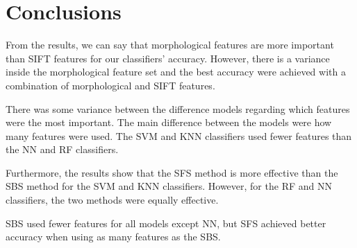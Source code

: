 \documentclass{kththesis}
\begin{document}
\chapter{Conclusions}

From the results, we can say that morphological features are more important than SIFT features for our classifiers' accuracy. However, there is a variance inside the morphological feature set and the best accuracy were achieved with a combination of morphological and SIFT features.

There was some variance between the difference models regarding which features were the most important. The main difference between the models were how many features were used. The SVM and KNN classifiers used fewer features than the NN and RF classifiers. 

Furthermore, the results show that the SFS method is more effective than the SBS method for the SVM and KNN classifiers. However, for the RF and NN classifiers, the two methods were equally effective.

SBS used fewer features for all models except NN, but SFS achieved better accuracy when using as many features as the SBS. %

\printbibliography[heading=bibintoc]


\tailmatter
\end{document}
